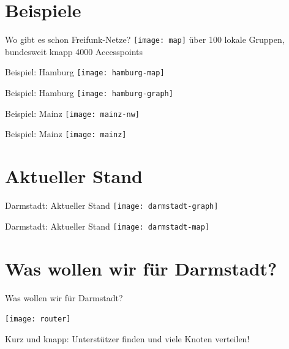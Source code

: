 \documentclass{beamer}
\begin{document}
\section{Beispiele}
\begin{frame}{Wo gibt es schon Freifunk-Netze?}
\vfill
\centering
\texttt{[image: map]}
\vfill
über 100 lokale Gruppen, bundesweit knapp 4000 Accesspoints
\vfill
\end{frame}

\begin{frame}{Beispiel: Hamburg}
\vfill
\centering
\texttt{[image: hamburg-map]}
\vfill
\end{frame}

\begin{frame}{Beispiel: Hamburg}
\vfill
\centering
\texttt{[image: hamburg-graph]}
\vfill
\end{frame}

\begin{frame}{Beispiel: Mainz}
\vfill
\centering
\texttt{[image: mainz-nw]}
\vfill
\end{frame}

\begin{frame}{Beispiel: Mainz}
\vfill
\centering
\texttt{[image: mainz]}
\vfill
\end{frame}

\section{Aktueller Stand}
\begin{frame}{Darmstadt: Aktueller Stand}
\vfill
\centering
\texttt{[image: darmstadt-graph]}
\vfill
\end{frame}

\begin{frame}{Darmstadt: Aktueller Stand}
\vfill
\centering
\texttt{[image: darmstadt-map]}
\vfill
\end{frame}

\section{Was wollen wir für Darmstadt?}
\begin{frame}{Was wollen wir für Darmstadt?}
\begin{center}
\vfill
\texttt{[image: router]}
\end{center}

\vfill
Kurz und knapp: Unterstützer finden und viele Knoten verteilen!
\vfill
\end{frame}
\end{document}
